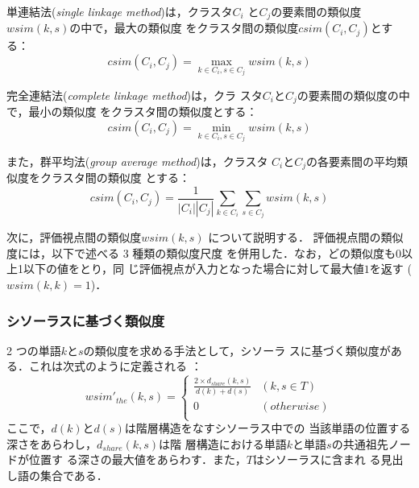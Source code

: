 \documentclass[japanese]{jnlp_1.4}
\begin{document}
単連結法(\textit{single linkage method})は，クラスタ$C_i$
と$C_j$の要素間の類似度$\mathit{wsim}(k, s)$の中で，最大の類似度
をクラスタ間の類似度$\mathit{csim}(C_i,C_j)$とする：
\begin{equation}
\label{eq:single}
\mathit{csim}(C_i,C_j) = \max_{k \in C_i, s \in C_j}\mathit{wsim}(k, s)
\end{equation} 

完全連結法(\textit{complete linkage method})は，クラ
スタ$C_i$と$C_j$の要素間の類似度の中で，最小の類似度
をクラスタ間の類似度とする：
\begin{equation}
\label{eq:complete}
\mathit{csim}(C_i,C_j) = \min_{k \in C_i, s \in C_j}\mathit{wsim}(k, s)
\end{equation} 

また，群平均法(\textit{group average method})は，クラスタ
$C_i$と$C_j$の各要素間の平均類似度をクラスタ間の類似度
とする：
\begin{equation}
\label{eq:group}
\mathit{csim}(C_i,C_j) = \frac{1}{|C_i||C_j|}\sum_{k \in C_i}\sum_{s \in C_j}\mathit{wsim}(k, s)
\end{equation} 

次に，評価視点間の類似度$\mathit{wsim}(k, s)$ について説明する．
評価視点間の類似度には，以下で述べる 3 種類の類似度尺度
を併用した．なお，どの類似度も0以上1以下の値をとり，同
じ評価視点が入力となった場合に対して最大値$1$を返す
 ($\mathit{wsim}(k, k) = 1$)．



\subsubsection{シソーラスに基づく類似度}

2 つの単語$k$と$s$の類似度を求める手法として，シソーラ
スに基づく類似度がある．これは次式のように定義される
\cite{nagao}：
\begin{equation}
\label{eq:thesaurus}
\mathit{wsim}'_\mathit{the}(k, s)=
 \begin{cases}
  \frac{2 × d_\mathit{share}(k, s)}{d(k)+d(s)} & (k,s \in T) \\
  0  & (\mathit{otherwise}) \\
\end{cases}
\end{equation}
ここで，$d(k)$と$d(s)$は階層構造をなすシソーラス中での
当該単語の位置する深さをあらわし，$d_\mathit{share}(k,s)$は階
層構造における単語$k$と単語$s$の共通祖先ノードが位置す
る深さの最大値をあらわす．また，$T$はシソーラスに含まれ
る見出し語の集合である．
\end{document}
